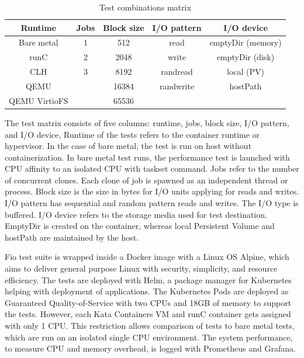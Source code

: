 \begin{table}[ht]
\centering
\caption{Test combinations matrix}
\vspace{\baselineskip}
\begin{tabular}{| c | c | c | c | c |}
\hline
\textbf{Runtime} & \textbf{Jobs} & \textbf{Block size} & \textbf{I/O pattern} & \textbf{I/O device} \\ 
\hline
Bare metal & 1 & 512 & read & emptyDir (memory) \\
\hline
runC & 2 & 2048 & write & emptyDir (disk) \\ 
\hline
CLH & 3 & 8192 & randread & local (PV) \\
\hline
QEMU & & 16384 & randwrite & hostPath \\
\hline
QEMU VirtioFS & & 65536 & & \\
\hline
\end{tabular}
\label{table:TestMatrix}
\end{table}

The test matrix consists of five columns: runtime, jobs, block size, I/O pattern, and I/O device, Runtime of the tests refers to the container runtime or hypervisor. In the case of bare metal, the test is run on host without containerization. In bare metal test runs, the performance test is launched with CPU affinity to an isolated CPU with taskset\cite{taskset} command. Jobs refer to the number of concurrent clones. Each clone of job is spawned as an independent thread or process. Block size is the size in bytes for I/O units applying for reads and writes. I/O pattern has sequential and random pattern reads and writes. The I/O type is buffered. I/O device refers to the storage media used for test destination. EmptyDir is created on the container, whereas local Persistent Volume and hostPath are maintained by the host.

Fio test suite is wrapped inside a Docker image with a Linux OS Alpine\cite{Alpine}, which aims to deliver general purpose Linux with security, simplicity, and resource efficiency. The tests are deployed with Helm\cite{Helm}, a package manager for Kubernetes helping with deployment of applications. The Kubernetes Pods are deployed as Guaranteed Quality-of-Service with two CPUs and 18GB of memory to support the tests. However, each Kata Containers VM and runC container gets assigned with only 1 CPU. This restriction allows comparison of tests to bare metal tests, which are run on an isolated single CPU environment. The system performance, to measure CPU and memory overhead, is logged with Prometheus and Grafana.

